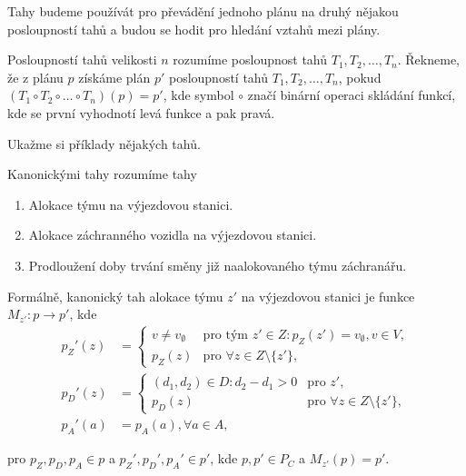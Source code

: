 Tahy budeme používát pro převádění jednoho plánu na druhý nějakou posloupností tahů a budou se hodit pro hledání vztahů mezi plány.

\begin{definice}
  Posloupností tahů velikosti $n$ rozumíme posloupnost tahů $T_1, T_2, \dots, T_n$.
  Řekneme, že z plánu $p$ získáme plán $p'$ posloupností tahů $T_1, T_2, \dots, T_n$,
  pokud $(T_1 \circ T_2 \circ \dots \circ T_n)(p) = p'$, kde symbol $\circ$ značí binární operaci skládání funkcí,
  kde se první vyhodnotí levá funkce a pak pravá.
\end{definice}

Ukažme si příklady nějakých tahů.

\begin{definice}
  Kanonickými tahy rozumíme tahy
  \begin{enumerate}
    \item
      Alokace týmu na výjezdovou stanici.

    \item
      Alokace záchranného vozidla na výjezdovou stanici.

    \item
      Prodloužení doby trvání směny již naalokovaného týmu záchranářu. 
  \end{enumerate}

  Formálně, kanonický tah alokace týmu $z'$ na výjezdovou stanici je funkce $M_{z'} : p \rightarrow p'$, kde
  \begin{align*}
    p_Z'(z) &=
      \begin{cases}
        v \neq v_{\emptyset} & \text{pro tým $z' \in Z \colon p_Z(z') = v_{\emptyset}, v \in V$}, \\
        p_Z(z) & \text{pro $\forall z \in Z \setminus \{ z' \}$},
      \end{cases}
      \\
    p_D'(z) &=
      \begin{cases}
        (d_1, d_2) \in D \colon d_2 - d_1 > 0 & \text{pro $z'$}, \\
        p_D(z) & \text{pro $\forall z \in Z \setminus \{ z' \}$},
      \end{cases}
      \\
    p_A'(a) &= p_A(a), \forall a \in A,
  \end{align*}

  pro $p_Z, p_D, p_A \in p$ a $p_Z', p_D', p_A' \in p'$, kde $p, p' \in P_C$ a $M_{z'}(p) = p'$.


\end{definice}
